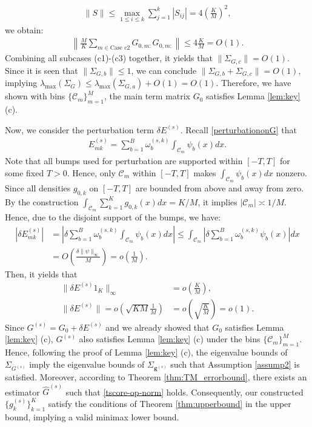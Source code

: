 \documentclass[preprint,11pt]{article}
\newcommand{\mcal}{\mathcal}
\numberwithin{equation}{section}
\begin{document}
\begin{align*}
    \|S\|\le \max_{1\le i\le k}\sum_{j=1}^k|S_{ij}|=4\left(\frac{K}{M}\right)^2,
\end{align*}
we obtain:
\begin{align*}
    \left\|\frac{M}{K}\sum_{m\in \text{Case c2}}G_{0,m:}G_{0,m:}\right\|\le 4\frac{K}{M}=O(1).
\end{align*}
Combining all subcases (c1)-(c3) together, it yields that $\|\Sigma_{G,c}\|=O(1)$. Since it is seen that $\|\Sigma_{G,b}\|\le 1$, we can conclude $\|\Sigma_{G,b}+\Sigma_{G,c}\|=O(1)$, implying $\lambda_{\max}(\Sigma_G)\le \lambda_{\max}(\Sigma_{G,a})+O(1)=O(1)$. Therefore, we have shown with bins $\{\mcal{C}_m\}_{m=1}^M$, the main term matrix $G_0$ satisfies Lemma \ref{lem:key} (c).

Now, we consider the perturbation term $\delta E^{(s)}$. Recall \eqref{perturbationonG} that 
\begin{align*}
    E_{mk}^{(s)}=\sum_{b=1}^B\omega_b^{(s,k)}\int_{\mcal{C}_m}\psi_b(x)dx.
\end{align*}
Note that all bumps used for perturbation are supported within $[-T,T]$ for some fixed $T>0$. Hence, only $\mcal{C}_m$ within $[-T,T]$ makes $\int_{\mcal{C}_m}\psi_b(x)dx$ nonzero. Since all densities $g_{0,k}$ on $[-T,T]$ are bounded from above and away from zero. By the construction $\int_{\mcal{C}_m}\sum_{k=1}^Kg_{0,k}(x)dx=K/M$, it implies $|\mcal{C}_m|\asymp 1/M$. Hence, due to the disjoint support of the bumps, we have:
\begin{align*}
    |\delta E_{mk}^{(s)}| &= \left|\delta\sum_{b=1}^B\omega_b^{(s,k)}\int_{\mcal{C}_m}\psi_b(x)dx\right|\le \int_{\mcal{C}_m}\left|\delta\sum_{b=1}^B\omega_b^{(s,k)}\psi_b(x)\right|dx\\
    &=O\left( \frac{\delta\|\psi\|_{\infty}}{M}\right)=o\left(\frac{1}{M}\right).
\end{align*}
Then, it yields that
\begin{align*}
    \|\delta E^{(s)}1_K\|_{\infty}&=o\left(\frac{K}{M}\right),\\
    \|\delta E^{(s)}\|=o\left(\sqrt{KM}\frac{1}{M}\right)&=o\left(\sqrt{\frac{K}{M}}\right)=o(1).
\end{align*}
Since $G^{(s)}= G_0+\delta E^{(s)}$ and we already showed that $G_0$ satisfies Lemma \ref{lem:key} (c), $G^{(s)}$ also satisfies Lemma \ref{lem:key} (c) under the bins $\{\mcal{C}_m\}_{m=1}^M$. Hence, following the proof of Lemma \ref{lem:key} (c), the eigenvalue bounds of $\Sigma_{G^{(s)}}$ imply the eigenvalue bounds of $\Sigma_{\bm{g}^{(s)}}$ such that Assumption \ref{assump2} is satisfied. Moreover, according to Theorem \ref{thm:TM_errorbound}, there exists an estimator $\widehat{G}^{(s)}$ such that \eqref{tscore-op-norm} holds. Consequently, our constructed $\{g_k^{(s)}\}_{k=1}^{K}$ satisfy the conditions of Theorem \ref{thm:upperbound} in the upper bound, implying a valid minimax lower bound.
\end{document}
